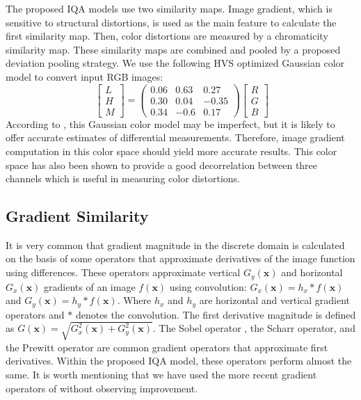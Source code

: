 The proposed IQA models use two similarity maps. Image gradient, which is sensitive to structural distortions, is used as the main feature to calculate the first similarity map. Then, color distortions are measured by a chromaticity similarity map. These similarity maps are combined and pooled by a proposed deviation pooling strategy. We use the following HVS optimized Gaussian color model to convert input RGB images:
\begin{equation}
  \ \begin{bmatrix}
L \\ H \\ M \end{bmatrix} = \begin{pmatrix}
0.06 & 0.63 & 0.27 \\ 0.30 & 0.04 & -0.35 \\ 0.34 & -0.6 & 0.17 \end{pmatrix}  \begin{bmatrix} R \\ G \\ B \end{bmatrix}
  \label{operators}
\end{equation} 
According to \cite{invariance2001}, this Gaussian color model may be imperfect, but it is likely to offer accurate estimates of differential measurements. Therefore, image gradient computation in this color space should yield more accurate results. This color space has also been shown to provide a good decorrelation between three channels which is useful in measuring color distortions.    



\subsection{Gradient Similarity}


It is very common that gradient magnitude in the discrete domain is calculated on the basis of some operators that approximate derivatives of the image function using differences. These operators approximate vertical $G_y(\textbf{x})$ and horizontal $G_x(\textbf{x})$ gradients of an image $f(\textbf{x})$ using convolution: $G_x(\textbf{x}) = h_x \ast f(\textbf{x})$ and $G_y(\textbf{x}) = h_y \ast f(\textbf{x})$. Where $h_x$ and $h_y$ are horizontal and vertical gradient operators and $\ast$ denotes the convolution. The first derivative magnitude is defined as $G(\textbf{x})=\sqrt{G^2_x(\textbf{x})+G^2_y(\textbf{x})}$. The Sobel operator \cite{sobel}, the Scharr operator, and the Prewitt operator are common gradient operators that approximate first derivatives. Within the proposed IQA model, these operators perform almost the same. It is worth mentioning that we have used the more recent gradient operators of \cite{Farid} without observing improvement.     

